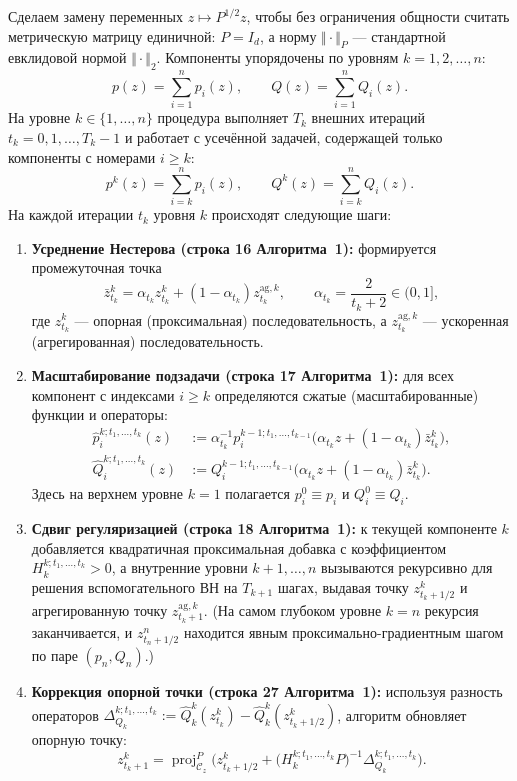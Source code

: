 \documentclass[11pt, a4paper]{article}
\theoremstyle{definition}
\begin{document}
Сделаем замену переменных $z \mapsto P^{1/2} z$, чтобы без ограничения общности считать метрическую матрицу единичной: $P = I_d$, а норму $\Vert \cdot \Vert_P$ --- стандартной евклидовой нормой $\Vert \cdot \Vert_2$. Компоненты упорядочены по уровням $k = 1, 2, \dots, n$:
\[
p(z) = \sum_{i=1}^n p_i(z), \qquad Q(z) = \sum_{i=1}^n Q_i(z).
\]
На уровне $k \in \{1, \dots, n\}$ процедура выполняет $T_k$ внешних итераций $t_k = 0, 1, \dots, T_k - 1$ и работает с усечённой задачей, содержащей только компоненты с номерами $i \ge k$:
\[
p^k(z) = \sum_{i=k}^n p_i(z), \qquad Q^k(z) = \sum_{i=k}^n Q_i(z).
\]
На каждой итерации $t_k$ уровня $k$ происходят следующие шаги:
\begin{enumerate}
    \item \textbf{Усреднение Нестерова (строка 16 Алгоритма~1):} формируется промежуточная точка
    \begin{equation}\label{eq:borodich_avg}
    \bar{z}_{t_k}^k = \alpha_{t_k} z_{t_k}^k + (1 - \alpha_{t_k}) z_{t_k}^{\mathrm{ag}, k}, \qquad \alpha_{t_k} = \frac{2}{t_k + 2} \in (0, 1],
    \end{equation}
    где $z_{t_k}^k$ --- опорная (проксимальная) последовательность, а $z_{t_k}^{\mathrm{ag}, k}$ --- ускоренная (агрегированная) последовательность.
    \item \textbf{Масштабирование подзадачи (строка 17 Алгоритма~1):} для всех компонент с индексами $i \ge k$ определяются сжатые (масштабированные) функции и операторы:
    \begin{align}
    \hat{p}_i^{k; t_1, \dots, t_k}(z) &:= \alpha_{t_k}^{-1} p_i^{k-1; t_1, \dots, t_{k-1}}\big(\alpha_{t_k} z + (1 - \alpha_{t_k}) \bar{z}_{t_k}^k\big), \label{eq:scaled_p} \\
    \hat{Q}_i^{k; t_1, \dots, t_k}(z) &:= Q_i^{k-1; t_1, \dots, t_{k-1}}\big(\alpha_{t_k} z + (1 - \alpha_{t_k}) \bar{z}_{t_k}^k\big). \label{eq:scaled_Q}
    \end{align}
    Здесь на верхнем уровне $k = 1$ полагается $p_i^0 \equiv p_i$ и $Q_i^0 \equiv Q_i$.
    \item \textbf{Сдвиг регуляризацией (строка 18 Алгоритма~1):} к текущей компоненте $k$ добавляется квадратичная проксимальная добавка с коэффициентом $H_k^{k; t_1, \dots, t_k} > 0$, а внутренние уровни $k+1, \dots, n$ вызываются рекурсивно для решения вспомогательного ВН на $T_{k+1}$ шагах, выдавая точку $z_{t_k + 1/2}^k$ и агрегированную точку $z_{t_k + 1}^{\mathrm{ag}, k}$. (На самом глубоком уровне $k = n$ рекурсия заканчивается, и $z_{t_n + 1/2}^n$ находится явным проксимально-градиентным шагом по паре $(p_n, Q_n)$.)
    \item \textbf{Коррекция опорной точки (строка 27 Алгоритма~1):} используя разность операторов $\Delta_{Q_k}^{k; t_1, \dots, t_k} := \hat{Q}_k^k(z_{t_k}^k) - \hat{Q}_k^k(z_{t_k + 1/2}^k)$, алгоритм обновляет опорную точку:
    \begin{equation}\label{eq:borodich_line27_orig}
    z_{t_k + 1}^k = \operatorname{proj}_{\mathcal{C}_z}^P\Big(z_{t_k + 1/2}^k + \big(H_k^{k; t_1, \dots, t_k} P\big)^{-1} \Delta_{Q_k}^{k; t_1, \dots, t_k}\Big).
    \end{equation}
\end{enumerate}
\end{document}
